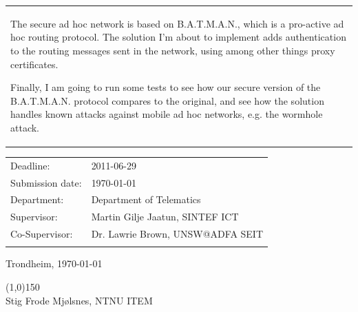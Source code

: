 \begin{titlepage}
\begin{center}
{{\begin{tabular}{p{15cm}}
The secure ad hoc network is based on B.A.T.M.A.N., which is a pro-active ad hoc routing protocol. The solution
I'm about to implement adds authentication to the routing messages sent in the network, using among other things
proxy certificates.

Finally, I am going to run some tests to see how our secure version of the B.A.T.M.A.N. protocol compares to the
original, and see how the solution handles known attacks against mobile ad hoc networks, e.g. the wormhole attack.

\end{tabular}  }}

\begin{tabular}{ p{4cm} p{11cm}}
Deadline: & 2011-06-29 \\
Submission date: & \today \\
Department: & Department of Telematics \\
Supervisor: & Martin Gilje Jaatun, SINTEF ICT \\
Co-Supervisor: & Dr. Lawrie Brown, UNSW@ADFA SEIT \\\\
\end{tabular}
\vspace{0.5cm}

Trondheim, \today 

\vspace{1cm}
\line(1,0){150} \\
Stig Frode Mj{\o}lsnes, NTNU ITEM

\end{center}
\end{titlepage}

